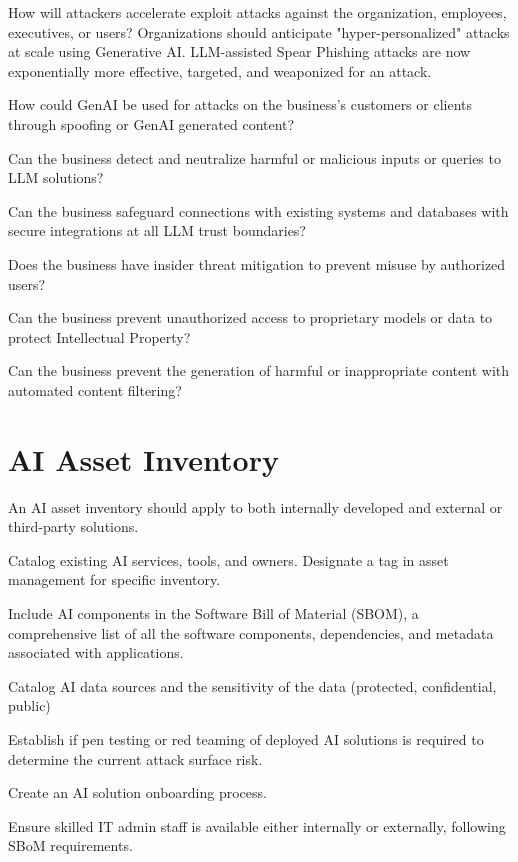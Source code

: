 \begin{minipage}{\linewidth}
\begin{checklist}
  \item How will attackers accelerate exploit attacks against the organization, employees, executives, or users? Organizations should anticipate "hyper-personalized" attacks at scale using Generative AI. LLM-assisted Spear Phishing attacks are now exponentially more effective, targeted, and weaponized for an attack.
  \item How could GenAI be used for attacks on the business's customers or clients through spoofing or GenAI generated content?
  \item Can the business detect and neutralize harmful or malicious inputs or queries to LLM solutions?
  \item Can the business safeguard connections with existing systems and databases with secure integrations at all LLM trust boundaries?
  \item Does the business have insider threat mitigation to prevent misuse by authorized users?
  \item Can the business prevent unauthorized access to proprietary models or data to protect Intellectual Property?
  \item Can the business prevent the generation of harmful or inappropriate content with automated content filtering?
\end{checklist}
\end{minipage}

\section{AI Asset Inventory}
An AI asset inventory should apply to both internally developed and external or third-party solutions.

\begin{minipage}{\linewidth}
\begin{checklist}
  \item Catalog existing AI services, tools, and owners. Designate a tag in asset management for specific inventory.
  \item Include AI components in the Software Bill of Material (SBOM), a comprehensive list of all the software components, dependencies, and metadata associated with applications.
  \item Catalog AI data sources and the sensitivity of the data (protected, confidential, public)
  \item Establish if pen testing or red teaming of deployed AI solutions is required to determine the current attack surface risk.
  \item Create an AI solution onboarding process.
  \item Ensure skilled IT admin staff is available either internally or externally, following SBoM requirements.
\end{checklist}
\end{minipage}

